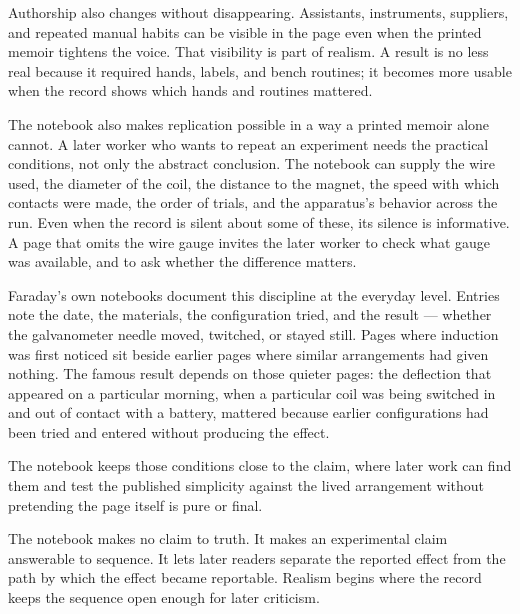 Authorship also changes without disappearing. Assistants, instruments,
suppliers, and repeated manual habits can be visible in the page even
when the printed memoir tightens the voice. That visibility is part of
realism. A result is no less real because it required hands, labels, and
bench routines; it becomes more usable when the record shows which hands
and routines mattered.

The notebook also makes replication possible in a way a printed memoir
alone cannot. A later worker who wants to repeat an experiment needs the
practical conditions, not only the abstract conclusion. The notebook can
supply the wire used, the diameter of the coil, the distance to the
magnet, the speed with which contacts were made, the order of trials, and the
apparatus's behavior across the run. Even when the record is silent
about some of these, its silence is informative. A page that omits the
wire gauge invites the later worker to check what gauge was available,
and to ask whether the difference matters.

Faraday's own notebooks document this discipline at the everyday level.
Entries note the date, the materials, the configuration tried, and the
result --- whether the galvanometer needle moved, twitched, or stayed
still. Pages where induction was first noticed sit beside earlier pages
where similar arrangements had given nothing. The famous result depends
on those quieter pages: the deflection that appeared on a particular
morning, when a particular coil was being switched in and out of contact
with a battery, mattered because earlier configurations had been tried
and entered without producing the effect.

The notebook keeps those conditions close to the claim, where later work
can find them and test the published simplicity against the lived
arrangement without pretending the page itself is pure or final.

The notebook makes no claim to truth. It makes an experimental claim
answerable to sequence. It lets later readers separate the reported
effect from the path by which the effect became reportable. Realism
begins where the record keeps the sequence open enough for later
criticism.

